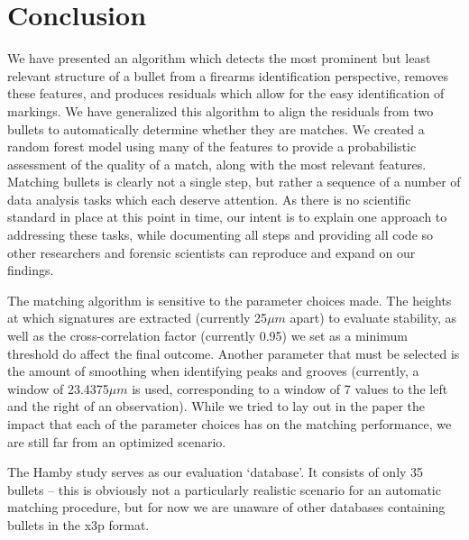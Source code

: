 \documentclass[aoas, preprint]{imsart}\usepackage[]{graphicx}\usepackage[]{color}
\begin{document}
\section{Conclusion}

We have presented an algorithm which detects the most prominent but least relevant structure of a bullet from a firearms identification perspective, removes these features, and produces residuals which allow for the easy identification of markings. We have generalized this algorithm to align the residuals from two bullets to automatically determine whether they are matches. We created a random forest model using many of the features to provide a probabilistic assessment of the quality of a match, along with the most relevant features. Matching bullets is clearly not a single step, but rather a sequence of a number of data analysis tasks which each deserve attention. As there is no scientific standard in place at this point in time, our intent is to explain one approach to addressing these tasks, while documenting all steps and providing all code so other researchers and forensic scientists can reproduce and expand on our findings.

The matching algorithm is sensitive to the parameter choices made. The heights at which signatures are extracted (currently 25$\mu m$ apart) to evaluate stability, as well as the cross-correlation factor (currently 0.95) we set as a minimum threshold do affect the final outcome. Another parameter that must be selected is the amount of smoothing when identifying peaks and grooves (currently, a window of 23.4375$\mu m$ is used, corresponding to a window of 7 values to the left and the right of an observation). While we tried to lay out in the paper the impact that each of the parameter choices has on the matching performance, we are still far from an optimized scenario. 

The Hamby study serves as our evaluation `database'. It consists of only  35 bullets -- this is obviously not a particularly realistic scenario for an automatic matching procedure, but for now we are unaware of other databases containing bullets in the x3p format.
 
\end{document}
